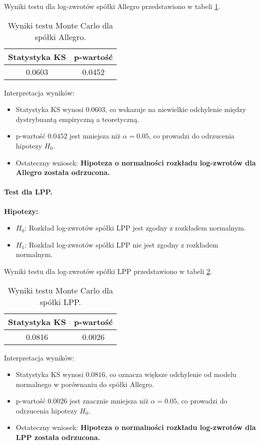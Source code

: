 \documentclass[12pt]{article}
\begin{document}
Wyniki testu dla log-zwrotów spółki Allegro przedstawiono w tabeli \ref{tab:mc_test_allegro}. 

\begin{table}[H]
\centering
\begin{tabular}{|c|c|}
\hline
\textbf{Statystyka KS} & \textbf{p-wartość} \\ \hline
0.0603 & 0.0452 \\ \hline
\end{tabular}
\caption{Wyniki testu Monte Carlo dla spółki Allegro.}
\label{tab:mc_test_allegro}
\end{table}

Interpretacja wyników:
\begin{itemize}
    \item Statystyka KS wynosi \( 0.0603 \), co wskazuje na niewielkie odchylenie między dystrybuantą empiryczną a teoretyczną.
    \item p-wartość \( 0.0452 \) jest mniejsza niż \( \alpha = 0.05 \), co prowadzi do odrzucenia hipotezy \( H_0 \). 
    \item Ostateczny wniosek: \textbf{Hipoteza o normalności rozkładu log-zwrotów dla Allegro została odrzucona.}
\end{itemize}

\paragraph{Test dla LPP.}  
\textbf{Hipotezy:}
\begin{itemize}
    \item \( H_0 \): Rozkład log-zwrotów spółki LPP jest zgodny z rozkładem normalnym.
    \item \( H_1 \): Rozkład log-zwrotów spółki LPP nie jest zgodny z rozkładem normalnym.
\end{itemize}

Wyniki testu dla log-zwrotów spółki LPP przedstawiono w tabeli \ref{tab:mc_test_lpp}.

\begin{table}[H]
\centering
\begin{tabular}{|c|c|}
\hline
\textbf{Statystyka KS} & \textbf{p-wartość} \\ \hline
0.0816 & 0.0026 \\ \hline
\end{tabular}
\caption{Wyniki testu Monte Carlo dla spółki LPP.}
\label{tab:mc_test_lpp}
\end{table}

Interpretacja wyników:
\begin{itemize}
    \item Statystyka KS wynosi \( 0.0816 \), co oznacza większe odchylenie od modelu normalnego w porównaniu do spółki Allegro.
    \item p-wartość \( 0.0026 \) jest znacznie mniejsza niż \( \alpha = 0.05 \), co prowadzi do odrzucenia hipotezy \( H_0 \). 
    \item Ostateczny wniosek: \textbf{Hipoteza o normalności rozkładu log-zwrotów dla LPP została odrzucona.}
\end{itemize}
\end{document}
